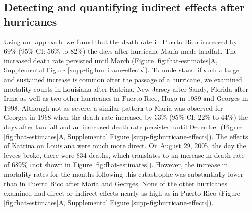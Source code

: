 \documentclass[11pt]{article}
\begin{document}
\subsection{Detecting and quantifying indirect effects after hurricanes}
\label{subsec:effects}
Using our approach, we found that the death rate in Puerto Rico increased by 69\% (95\% CI: 56\% to 82\%) the days after hurricane Mar\'ia made landfall. The increased death rate persisted until March (Figure \ref{fig:fhat-estimates}A, Supplemental Figure \ref{supp-fig:hurricane-effects}). To understand if such a large and sustained increase is common after the passage of a hurricane, we examined mortality counts in Louisiana after Katrina, New Jersey after Sandy, Florida after Irma as well as two other hurricanes in Puerto Rico, Hugo in 1989 and Georges in 1998.  Although not as severe, a similar pattern to Mar\'ia was observed for Georges in 1998 when the death rate increased by 33\% (95\% CI: 22\% to 44\%) the days after landfall and an increased death rate persisted until December (Figure \ref{fig:fhat-estimates}A, Supplemental Figure \ref{supp-fig:hurricane-effects}). The effects of Katrina on Louisiana were much more direct. On August 29, 2005, the day the levees broke, there were 834 deaths, which translates to an increase in death rate of 689\% (not shown in Figure \ref{fig:fhat-estimates}). However, the increase in mortality rates for the months following this catastrophe was substantially lower than in Puerto Rico after Mar\'ia and Georges. None of the other hurricanes examined had direct or indirect effects nearly as high as in Puerto Rico (Figure \ref{fig:fhat-estimates}A, Supplemental Figure \ref{supp-fig:hurricane-effects}).
\end{document}
